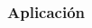 \documentclass[14pt]{beamer}
\begin{document}
\begin{frame}
\frametitle{Aplicación}

\begin{columns}
\begin{column}{0.25\textwidth}
\begin{center}


\end{center}
\end{column}

\end{columns}

\end{frame}
\end{document}
